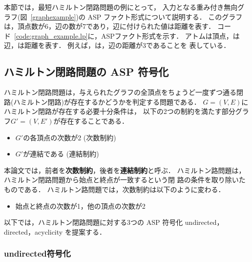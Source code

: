 


本節では，最短ハミルトン閉路問題の例にとって，
入力となる重み付き無向グラフ(図~\ref{graphexample})の
ASP ファクト形式について説明する．
%
このグラフは，頂点数が6，辺の数が7であり，辺に付けられた値は距離を表す．
コード~\ref{code:graph_example.lp}に，ASPファクト形式を示す．
%
アトムは頂点，は辺，は距離を表す．
例えば，は，辺の距離が3であることを
表している．

\subsection{ハミルトン閉路問題の ASP 符号化}\label{hamiltonianasp}

ハミルトン閉路問題は，与えられたグラフの全頂点をちょうど一度ずつ通る閉
路(ハミルトン閉路)が存在するかどうかを判定する問題である．
$G=(V,E)$にハミルトン閉路が存在する必要十分条件は，
以下の2つの制約を満たす部分グラフ$G'=(V,E')$が存在することである．

\begin{itemize}
\item $G'$の各頂点の次数が2 (次数制約)
\item $G'$が連結である (連結制約)
\end{itemize}

本論文では，前者を\textbf{次数制約}，後者を\textbf{連結制約}と呼ぶ．
ハミルトン路問題は，ハミルトン閉路問題から始点と終点が一致するという閉
路の条件を取り除いたものである．
ハミルトン路問題では，次数制約は以下のように変わる．

\begin{itemize}
\item 始点と終点の次数が1，他の頂点の次数が2
\end{itemize}

以下では，ハミルトン閉路問題に対する3つの ASP 符号化
\textsf{undirected}，\textsf{directed}，\textsf{acyclicity}
を提案する．

\subsubsection{\textsf{undirected}符号化}

